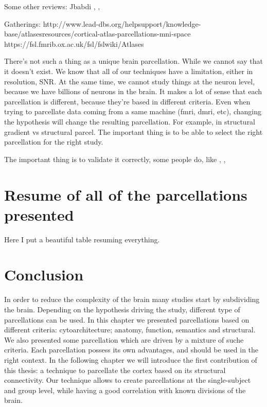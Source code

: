 Some other reviews: Jbabdi \cite{Jbabdi2013}, \cite{Arslan2018}, 

Gatherings: http://www.lead-dbs.org/helpsupport/knowledge-base/atlasesresources/cortical-atlas-parcellations-mni-space
            https://fsl.fmrib.ox.ac.uk/fsl/fslwiki/Atlases


There's not such a thing as a unique brain parcellation. While we cannot say
that it doesn't exist. We know that all of our techniques have a limitation,
either in resolution, SNR. At the same time, we cannot study things at the
neuron level, because we have billions of neurons in the brain. It makes a
lot of sense that each parcellation is different, because they're based
in different criteria. Even when trying to parcellate data coming from a
same machine (fmri, dmri, etc), changing the hypothesis will change the 
resulting parcellation. For example, in structural gradient vs structural
parcel. The important thing is to be able to select the right parcellation
for the right study.

The important thing is to validate it correctly, some people do, like \cite{Gallardo}, \cite{Auzias2016}, \cite{ThiebautdeSchotten2014, ThiebautdeSchotten2016}

\section{Resume of all of the parcellations presented}
Here I put a beautiful table resuming everything.

\section{Conclusion}
In order to reduce the complexity of the brain many studies start by subdividing
the brain. Depending on the hypothesis driving the study, different type
of parcellations can be used. In this chapter we presented parcellations based
on different criteria: cytoarchitecture; anatomy, function, semantics and
structural. We also presented some parcellation which are driven by a mixture
of suche criteria. Each parcellation possess its own advantages, and should be
used in the right context. In the following chapter we will introduce the
first contribution of this thesis: a technique to parcellate the cortex based
on its structural connectivity. Our technique allows to create parcellations
at the single-subject and group level, while having a good correlation with
known divisions of the brain.


\chapterbib
